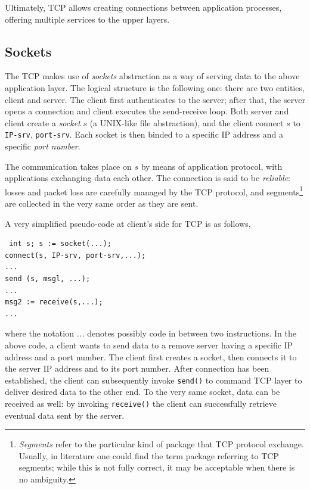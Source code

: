 \documentclass[10pt]{book}
\begin{document}
Ultimately, TCP allows creating connections between application processes,
offering multiple services to the upper layers.

\subsection{Sockets}

The TCP makes use of \emph{sockets} abstraction as a way of serving data to the
above application layer. The logical structure is the following one: there are
two entities, client and server. The client first authenticates to the server;
after that, the server opens a connection and client executes the send-receive
loop. Both server and client create a \emph{socket} $s$ (a UNIX-like file
abstraction), and the client connect $s$ to \texttt{IP-srv}, \texttt{port-srv}.
Each socket is then binded to a specific IP address and a specific \emph{port
number}.

The communication takes place on $s$ by means of application protocol, with
applications exchanging data each other. The connection is said to be
\emph{reliable}: losses and packet loss are carefully managed by the TCP protocol, and
segments\footnote{\emph{Segments} refer to the particular kind of package that
TCP protocol exchange. Usually, in literature one could find the term package
referring to TCP segments; while this is not fully correct, it may be
acceptable when there is no ambiguity.} are collected in the very same order as
they are sent.

A very simplified pseudo-code at client's side for TCP is as follows,

\begin{verbatim} int s; s := socket(...); 
connect(s, IP-srv, port-srv,...); 
...
send (s, msgl, ...); 
... 
msg2 := receive(s,...); 
... 
\end{verbatim}

where the notation \emph{...} denotes possibly code in between two
instructions. In the above code, a client wants to send data to a remove server
having a specific IP address and a port number. The client first creates a
socket, then connects it to the server IP address and to its port number. After
connection has been established, the client can subsequently invoke
\texttt{send()} to command TCP layer to deliver desired data to the other end.
To the very same socket, data can be received as well: by invoking
\texttt{receive()} the client can successfully retrieve eventual data sent by
the server.
\end{document}
